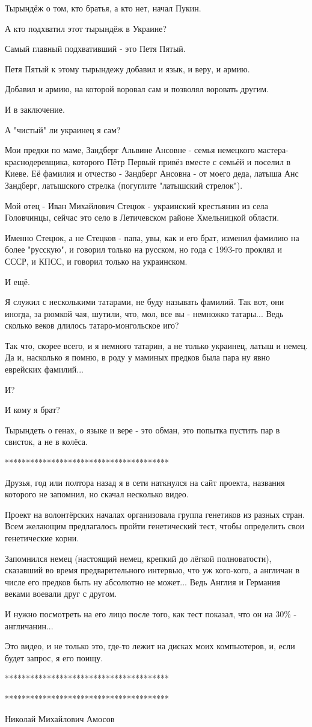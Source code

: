 Тырындёж о том, кто братья, а кто нет, начал Пукин. 

А кто подхватил этот тырындёж в Украине?

Самый главный подхвативший - это Петя Пятый.

Петя Пятый к этому тырындежу добавил и язык, и веру, и армию.

Добавил и армию, на которой воровал сам и позволял воровать другим.

И в заключение.

А "чистый" ли украинец я сам?

Мои предки по маме, Зандберг Альвине Ансовне - семья немецкого
мастера-краснодеревщика, которого Пётр Первый привёз вместе с семьёй и поселил
в Киеве. Её фамилия и отчество - Зандберг Ансовна - от моего деда, латыша Анс
Зандберг, латышского стрелка (погуглите "латышский стрелок").

Мой отец - Иван Михайлович Стецюк - украинский крестьянин из села Головчинцы,
сейчас это село в Летичевском районе Хмельницкой области.

Именно Стецюк, а не Стецков - папа, увы, как и его брат, изменил фамилию на
более "русскую", и говорил только на русском, но года с 1993-го проклял и СССР,
и КПСС, и говорил только на украинском.

И ещё.

Я служил с несколькими татарами, не буду называть фамилий. Так вот, они иногда,
за рюмкой чая, шутили, что, мол, все вы - немножко татары... Ведь сколько веков
длилось татаро-монгольское иго?

Так что, скорее всего, и я немного татарин, а не только украинец, латыш и
немец. Да и, насколько я помню, в роду у маминых предков была пара ну явно
еврейских фамилий... 

И?

И кому я брат?

Тырындеть о генах, о языке и вере - это обман, это попытка пустить пар в
свисток, а не в колёса.

***************************************

Друзья, год или полтора назад я в сети наткнулся на сайт проекта, названия
которого не запомнил, но скачал несколько видео.

Проект на волонтёрских началах организовала группа генетиков из разных стран.
Всем желающим предлагалось пройти генетический тест, чтобы определить свои
генетические корни.

Запомнился немец (настоящий немец, крепкий до лёгкой полноватости), сказавший
во время предварительного интервью, что уж кого-кого, а англичан в числе его
предков быть ну абсолютно не может... Ведь Англия и Германия веками воевали
друг с другом.

И нужно посмотреть на его лицо после того, как тест показал, что он на 30\% -
англичанин... 

Это видео, и не только это, где-то лежит на дисках моих компьютеров, и, если
будет запрос, я его поищу.

***************************************

***************************************

Николай Михайлович Амосов

